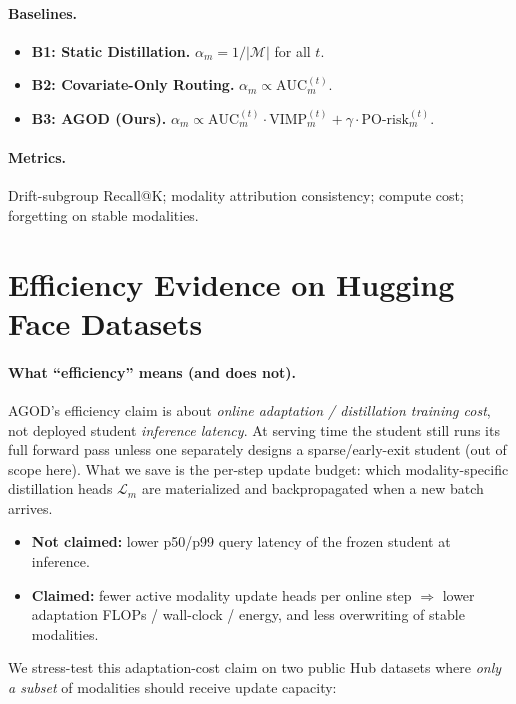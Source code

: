 \documentclass[11pt]{article}
\begin{document}
\paragraph{Baselines.}
\begin{itemize}
    \item \textbf{B1: Static Distillation.} \(\alpha_m = 1/|\mathcal{M}|\) for all \(t\).
    \item \textbf{B2: Covariate-Only Routing.} \(\alpha_m \propto \text{AUC}_m^{(t)}\).
    \item \textbf{B3: AGOD (Ours).} \(\alpha_m \propto \text{AUC}_m^{(t)} \cdot \text{VIMP}_m^{(t)} + \gamma \cdot \text{PO-risk}_m^{(t)}\).
\end{itemize}

\paragraph{Metrics.} Drift-subgroup Recall@K; modality attribution consistency; compute cost; forgetting on stable modalities.

\section{Efficiency Evidence on Hugging Face Datasets}
\label{sec:efficiency}

\paragraph{What ``efficiency'' means (and does not).}
AGOD's efficiency claim is about \emph{online adaptation / distillation training cost}, not deployed student \emph{inference latency}.
At serving time the student still runs its full forward pass unless one separately designs a sparse/early-exit student (out of scope here).
What we save is the per-step update budget: which modality-specific distillation heads \(\mathcal{L}_m\) are materialized and backpropagated when a new batch arrives.

\begin{itemize}
    \item \textbf{Not claimed:} lower p50/p99 query latency of the frozen student at inference.
    \item \textbf{Claimed:} fewer active modality update heads per online step $\Rightarrow$ lower adaptation FLOPs / wall-clock / energy, and less overwriting of stable modalities.
\end{itemize}

We stress-test this adaptation-cost claim on two public Hub datasets where \emph{only a subset} of modalities should receive update capacity:
\end{document}
